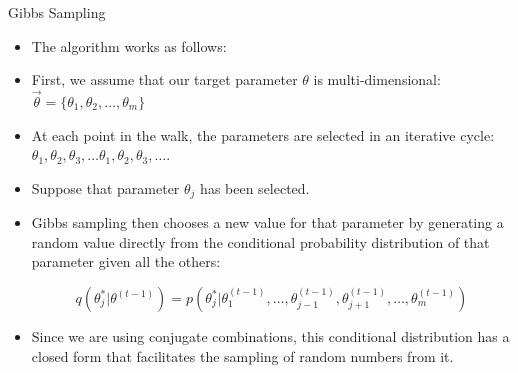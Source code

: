\documentclass[handout]{beamer}
\begin{document}
\begin{frame}{Gibbs Sampling}
\scriptsize{

\begin{itemize}


\item The algorithm works as follows:

\item First, we assume that our target parameter $\theta$ is multi-dimensional: $\vec{\theta}=\{\theta_1,\theta_2,\dots,\theta_m\}$

\item At each point in the walk, the parameters are selected in an iterative cycle: $\theta_1, \theta_2, \theta_3 , \dots \theta_1, \theta_2, \theta_3, \dots.$

\item Suppose that parameter $\theta_j$ has been selected.

\item Gibbs sampling then chooses a new value for that parameter by generating a random value directly from
the conditional probability distribution of that parameter given all the others:

\begin{displaymath}
q(\theta^{*}_j|\theta^{(t-1)}) = p(\theta^{*}_j | \theta^{(t-1)}_1,\dots, \theta^{(t-1)}_{j-1}, \theta^{(t-1)}_{j+1}, \dots,\theta^{(t-1)}_m)
\end{displaymath}


\item Since we are using conjugate combinations, this conditional distribution has a closed form that facilitates the sampling of random numbers from it.



\end{itemize}


} 
\end{frame}
\end{document}
